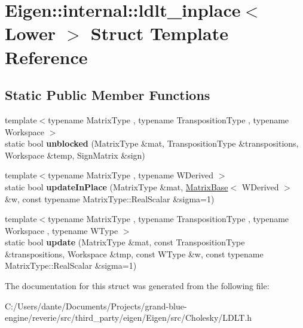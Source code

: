 \hypertarget{struct_eigen_1_1internal_1_1ldlt__inplace_3_01_lower_01_4}{}\section{Eigen\+::internal\+::ldlt\+\_\+inplace$<$ Lower $>$ Struct Template Reference}
\label{struct_eigen_1_1internal_1_1ldlt__inplace_3_01_lower_01_4}
\subsection*{Static Public Member Functions}
\begin{DoxyCompactItemize}
\item 
\mbox{\label{struct_eigen_1_1internal_1_1ldlt__inplace_3_01_lower_01_4_a6d8b99ce128d626854fff3517cf81e9c}} 
{\footnotesize template$<$typename Matrix\+Type , typename Transposition\+Type , typename Workspace $>$ }\\static bool {\bfseries unblocked} (Matrix\+Type \&mat, Transposition\+Type \&transpositions, Workspace \&temp, Sign\+Matrix \&sign)
\item 
\mbox{\label{struct_eigen_1_1internal_1_1ldlt__inplace_3_01_lower_01_4_a108b58e95ea9d74496b78803311769dd}} 
{\footnotesize template$<$typename Matrix\+Type , typename W\+Derived $>$ }\\static bool {\bfseries update\+In\+Place} (Matrix\+Type \&mat, \mbox{\hyperlink{class_eigen_1_1_matrix_base}{Matrix\+Base}}$<$ W\+Derived $>$ \&w, const typename Matrix\+Type\+::\+Real\+Scalar \&sigma=1)
\item 
\mbox{\label{struct_eigen_1_1internal_1_1ldlt__inplace_3_01_lower_01_4_ae45df1fbda86712753262a9200f8c97b}} 
{\footnotesize template$<$typename Matrix\+Type , typename Transposition\+Type , typename Workspace , typename W\+Type $>$ }\\static bool {\bfseries update} (Matrix\+Type \&mat, const Transposition\+Type \&transpositions, Workspace \&tmp, const W\+Type \&w, const typename Matrix\+Type\+::\+Real\+Scalar \&sigma=1)
\end{DoxyCompactItemize}


The documentation for this struct was generated from the following file\+:\begin{DoxyCompactItemize}
\item 
C\+:/\+Users/dante/\+Documents/\+Projects/grand-\/blue-\/engine/reverie/src/third\+\_\+party/eigen/\+Eigen/src/\+Cholesky/L\+D\+L\+T.\+h\end{DoxyCompactItemize}
